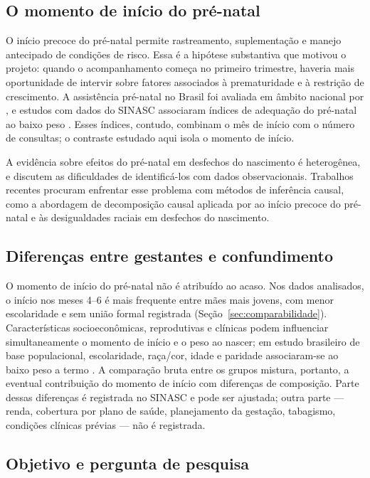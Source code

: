 \documentclass[11pt,a4paper]{article}
\begin{document}
\subsection{O momento de início do pré-natal}

O início precoce do pré-natal permite rastreamento, suplementação e manejo antecipado de
condições de risco. Essa é a hipótese substantiva que motivou o projeto: quando o
acompanhamento começa no primeiro trimestre, haveria mais oportunidade de intervir sobre
fatores associados à prematuridade e à restrição de crescimento. A assistência pré-natal
no Brasil foi avaliada em âmbito nacional por , e estudos com
dados do SINASC associaram índices de adequação do pré-natal ao baixo peso
\cite{vale2021}. Esses índices, contudo, combinam o mês de início com o número de
consultas; o contraste estudado aqui isola o momento de início.

A evidência sobre efeitos do pré-natal em desfechos do nascimento é heterogênea, e
 discutem as dificuldades de identificá-los com dados
observacionais. Trabalhos recentes procuram enfrentar esse problema com métodos de
inferência causal, como a abordagem de decomposição causal aplicada por
 ao início precoce do pré-natal e às desigualdades raciais em
desfechos do nascimento.

\subsection{Diferenças entre gestantes e confundimento}

O momento de início do pré-natal não é atribuído ao acaso. Nos dados analisados, o início
nos meses 4--6 é mais frequente entre mães mais jovens, com menor escolaridade e sem união
formal registrada (Seção~\ref{sec:comparabilidade}). Características socioeconômicas,
reprodutivas e clínicas podem influenciar simultaneamente o momento de início e o peso ao
nascer; em estudo brasileiro de base populacional, escolaridade, raça/cor, idade e
paridade associaram-se ao baixo peso a termo \cite{falcao2020}. A comparação bruta entre
os grupos mistura, portanto, a eventual contribuição do momento de início com diferenças
de composição. Parte dessas diferenças é registrada no SINASC e pode ser ajustada; outra
parte --- renda, cobertura por plano de saúde, planejamento da gestação, tabagismo,
condições clínicas prévias --- não é registrada.

\subsection{Objetivo e pergunta de pesquisa}
\end{document}
